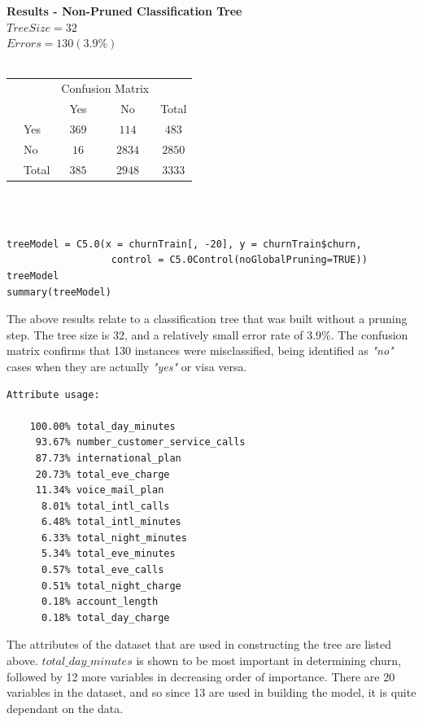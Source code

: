 \documentclass[paper=a4, fontsize=11pt]{scrartcl} %
\begin{document}
\clearpage
{\bf \noindent Results - Non-Pruned Classification Tree}\\
$Tree Size = 32$  \\
$Errors = 130 (3.9\%)$\\\\
\begin{tabular}{l|l|c|c|c}
\multicolumn{2}{c}{}&\multicolumn{2}{c}{Confusion Matrix}&\\
\cline{3-4}
\multicolumn{2}{c|}{}&Yes&No&\multicolumn{1}{c}{Total}\\
\cline{2-4}
\multirow{2}{*}{}& Yes & $369$ & $114$ & $483$\\
\cline{2-4}
& No & $16$ & $2834$ & $2850$\\
\cline{2-4}
\multicolumn{1}{c}{} & \multicolumn{1}{c}{Total} & \multicolumn{1}{c}{$385$} & \multicolumn{    1}{c}{$2948$} & \multicolumn{1}{c}{$3333$}\\
\end{tabular}\\\\
\begin{lstlisting}
treeModel = C5.0(x = churnTrain[, -20], y = churnTrain$churn,
                  control = C5.0Control(noGlobalPruning=TRUE))
treeModel
summary(treeModel)
\end{lstlisting}
{\par The above results relate to a classification tree that was built without a pruning step. The tree size is 32, and a relatively small error rate of $3.9\%$. The confusion matrix confirms that 130 instances were misclassified, being identified as {\it "no"} cases when they are actually {\it "yes"} or visa versa.
\small{
\begin{verbatim}
Attribute usage:

	100.00%	total_day_minutes
	 93.67%	number_customer_service_calls
	 87.73%	international_plan
	 20.73%	total_eve_charge
	 11.34%	voice_mail_plan
	  8.01%	total_intl_calls
	  6.48%	total_intl_minutes
	  6.33%	total_night_minutes
	  5.34%	total_eve_minutes
	  0.57%	total_eve_calls
	  0.51%	total_night_charge
	  0.18%	account_length
	  0.18%	total_day_charge

\end{verbatim}}
\noindent The attributes of the dataset that are used in constructing the tree are listed above. $total\_day\_minutes$ is shown to be most important in determining churn, followed by 12 more variables in decreasing order of importance. There are 20 variables in the dataset, and so since 13 are used in building the model, it is quite dependant on the data. 
}\\\\
\end{document}
